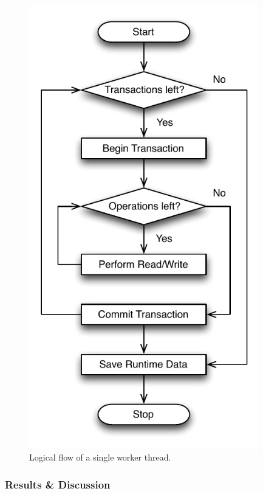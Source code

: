 \begin{figure}[h!]
\begin{minipage}[l]{0.50\textwidth}
    \includegraphics[width=0.89\textwidth]{figures/bench/worker}
    \caption{Logical flow of a single worker thread.}
    \label{fig:eval-worker}
\end{minipage}
\end{figure}

\subsubsection{Results \& Discussion}


